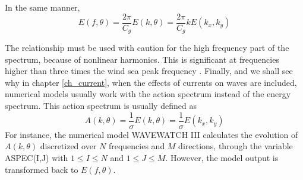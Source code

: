 In the same manner, 
 \begin{equation}
E(f,\theta)= \frac{2\pi}{C_g} E(k,\theta)= \frac{2\pi}{C_g}k E(k_{x},k_{y}) %
\label{eq:Eftheta_Ekxky}
\end{equation}

The relationship must be used with caution for the high frequency part of the spectrum, because of nonlinear harmonics. This is significant at frequencies higher than three times the wind sea peak frequency \citep{Leckler&al.2015,Peureux&al.2018}. 
Finally, and we shall see why in chapter \ref{ch_current}, when the effects of currents on  waves are included, numerical models 
usually work with the action spectrum instead of the energy spectrum. This action spectrum is usually defined as 
 \begin{equation}
A(k,\theta)=\frac{1}{\sigma}E(k,\theta)=\frac{1}{\sigma}E(k_{x},k_{y})
\label{eq3.10}
\end{equation}
For instance, the numerical model WAVEWATCH III \citep{Tolman&Booij1998} calculates the evolution of $A(k,\theta)$ discretized over
 $N$ frequencies and $M$ directions, through the variable ASPEC(I,J) with $1 \leq I \leq N $ and $1 \leq J \leq M $. However, 
the model output is transformed back to $E(f,\theta)$.
 

